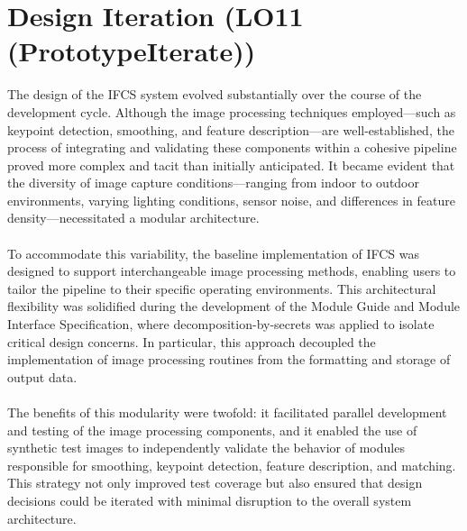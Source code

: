 \documentclass{article}
\begin{document}
\section{Design Iteration (LO11 (PrototypeIterate))}
The design of the IFCS system evolved substantially over the course of the development cycle. Although the image processing techniques employed---such as keypoint detection, smoothing, and feature description---are well-established, the process of integrating and validating these components within a cohesive pipeline proved more complex and tacit than initially anticipated. It became evident that the diversity of image capture conditions---ranging from indoor to outdoor environments, varying lighting conditions, sensor noise, and differences in feature density---necessitated a modular architecture.
\\
\\
To accommodate this variability, the baseline implementation of IFCS was designed to support interchangeable image processing methods, enabling users to tailor the pipeline to their specific operating environments. This architectural flexibility was solidified during the development of the Module Guide and Module Interface Specification, where decomposition-by-secrets was applied to isolate critical design concerns. In particular, this approach decoupled the implementation of image processing routines from the formatting and storage of output data.
\\
\\
The benefits of this modularity were twofold: it facilitated parallel development and testing of the image processing components, and it enabled the use of synthetic test images to independently validate the behavior of modules responsible for smoothing, keypoint detection, feature description, and matching. This strategy not only improved test coverage but also ensured that design decisions could be iterated with minimal disruption to the overall system architecture.
\end{document}
